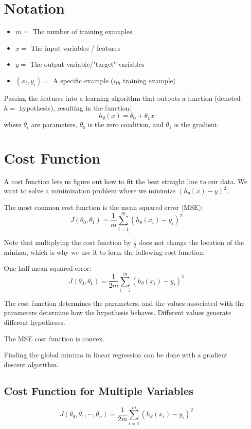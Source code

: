 \section{Notation}
\begin{itemize}
    \item $m = $ The number of training examples
    \item $x = $ The input variables / features
    \item $y = $ The output variable/"target" variables
    \item $(x_i, y_i) = $ A specific example ($i_{th}$ training example)
\end{itemize}

Passing the features into a learning algorithm that outputs a function (denoted $h = $ hypothesis), resulting in the function:
\[
    h_\theta(x) = \theta_0+\theta_1 x
\]
where $\theta_i$ are parameters, $\theta_0$ is the zero condition, and $\theta_1$ is the gradient.

\section{Cost Function}
A cost function lets us figure out how to fit the best straight line to our data.
We want to solve a minimization problem where we minimize $(h_\theta(x)-y)^2$.

The most common cost function is the mean squared error (MSE):
\[
    J(\theta_0, \theta_1) = \frac{1}{m}\sum_{i=1}^m\left(h_\theta(x_i)-y_i\right)^2
\]

Note that multiplying the cost function by $\frac{1}{2}$ does not change the location of the minima, which is why we use it to form the following cost function:
\bigskip

One half mean squared error:
\[
    J(\theta_0, \theta_1) = \frac{1}{2m}\sum_{i=1}^m\left(h_\theta(x_i)-y_i\right)^2
\]

The cost function determines the parameters, and the values associated with the parameters determine how the hypothesis behaves.
Different values generate different hypotheses.

The MSE cost function is convex.

Finding the global minima in linear regression can be done with a gradient descent algorithm.

\subsection{Cost Function for Multiple Variables}
\[
    J(\theta_0, \theta_1, \cdots, \theta_n) = \frac{1}{2m}\sum_{i=1}^m\left(h_\theta(x_i)-y_i\right)^2
\]

